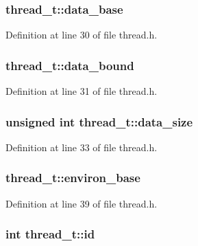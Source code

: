 \subsubsection[{data\_\-base}]{ {\bf thread\_\-t::data\_\-base}}\label{structthread__t_c441bcf5fa5936c0146e500ceba852b5}




Definition at line 30 of file thread.h.
\subsubsection[{data\_\-bound}]{ {\bf thread\_\-t::data\_\-bound}}\label{structthread__t_8a33131270eda03bab8714241edb44b3}




Definition at line 31 of file thread.h.
\subsubsection[{data\_\-size}]{\setlength{\rightskip}{0pt plus 5cm}unsigned int {\bf thread\_\-t::data\_\-size}}\label{structthread__t_5ab70f5887949085e78b37f367d3e79c}




Definition at line 33 of file thread.h.
\subsubsection[{environ\_\-base}]{ {\bf thread\_\-t::environ\_\-base}}\label{structthread__t_70742c9de3b34df4630fb7930617987b}




Definition at line 39 of file thread.h.
\subsubsection[{id}]{\setlength{\rightskip}{0pt plus 5cm}int {\bf thread\_\-t::id}}\label{structthread__t_96d4de2e7317c46b7f55f1ca2ef6a350}




